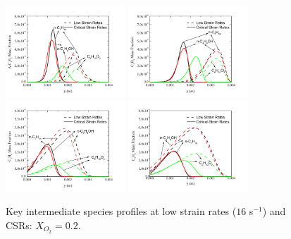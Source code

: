 \documentclass[review,3p,times]{elsarticleUS}
\begin{document}
\begin{figure}[ht]
  \centering
  \scriptsize
  \includegraphics[trim=4mm 8mm 30mm 20mm, clip=true, width=0.4\textwidth]{A-C3H5-y.png}
  \includegraphics[trim=4mm 8mm 30mm 20mm, clip=true, width=0.4\textwidth]{C3H3-y.png}
  \includegraphics[trim=4mm 8mm 30mm 20mm, clip=true, width=0.4\textwidth]{C5H6-y.png}
  \includegraphics[trim=4mm 8mm 30mm 20mm, clip=true, width=0.4\textwidth]{A1-y.png}
  \normalsize
  \vspace{-0.1in}
  \caption{Key intermediate species profiles at low strain rates ($16$ s$^{-1}$) and CSRs: $X_{O_2}=0.2$.}
  \label{fig:CxHy}
\end{figure}
\end{document}
